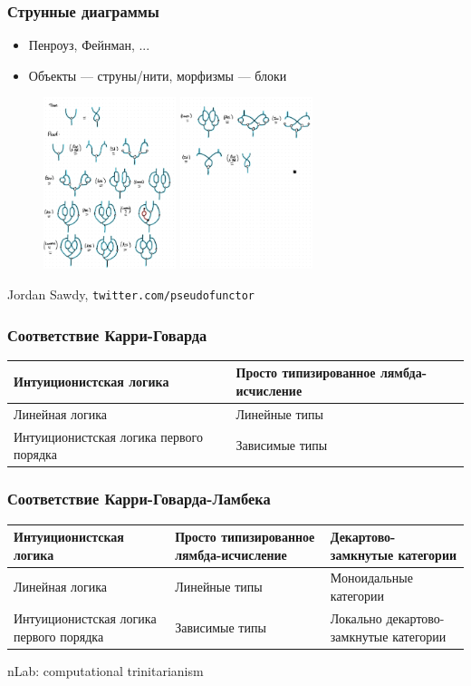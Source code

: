 \documentclass{beamer}
\begin{document}
\begin{frame}
\frametitle{Струнные диаграммы}
\begin{itemize}
\item Пенроуз, Фейнман, ...
\item Объекты --- струны/нити, морфизмы --- блоки
\end{itemize}
\begin{figure}
\includegraphics[height=5cm]{addition-commutative-1.jpeg}
\includegraphics[height=5cm]{addition-commutative-2.jpeg}
\end{figure}
Jordan Sawdy, \texttt{twitter.com/pseudofunctor}
\end{frame}

\begin{frame}
\frametitle{Соответствие Карри-Говарда}
\begin{tabular}{|p{3cm}|p{3cm}|}
\hline
Интуиционистская логика & Просто типизированное лямбда-исчисление \\
\hline
Линейная логика & Линейные типы \\
\hline
Интуиционистская логика первого порядка & Зависимые типы \\
\hline
\end{tabular}
\end{frame}

\begin{frame}
\frametitle{Соответствие Карри-Говарда-Ламбека}
\begin{tabular}{|p{3cm}|p{3cm}|p{3cm}|}
\hline
Интуиционистская логика & Просто типизированное лямбда-исчисление & Декартово-замкнутые  категории \\
\hline
Линейная логика & Линейные типы & Моноидальные категории \\
\hline
Интуиционистская логика первого порядка & Зависимые типы & Локально декартово-замкнутые категории \\
\hline
\end{tabular}
\newline
\newline
nLab: computational trinitarianism
\end{frame}
\end{document}
